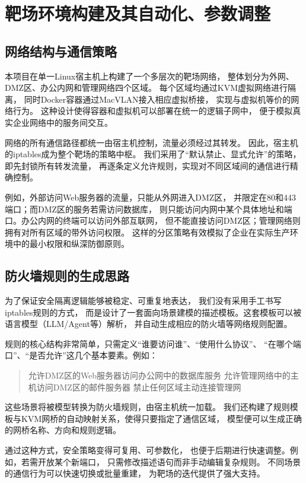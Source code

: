 \documentclass[lang=cn,10pt]{elegantbook}
\begin{document}
\section{靶场环境构建及其自动化、参数调整}

\subsection{网络结构与通信策略}

本项目在单一Linux宿主机上构建了一个多层次的靶场网络，
整体划分为外网、DMZ区、办公内网和管理网络四个区域。
每个区域均通过KVM虚拟网络进行隔离，
同时Docker容器通过MacVLAN接入相应虚拟桥接，
实现与虚拟机等价的网络行为。
这种设计使得容器和虚拟机可以部署在统一的逻辑子网中，
便于模拟真实企业网络中的服务间交互。

网络的所有通信路径都统一由宿主机控制，流量必须经过其转发。
因此，宿主机的iptables成为整个靶场的策略中枢。
我们采用了“默认禁止、显式允许”的策略，即先封锁所有转发流量，
再逐条定义允许规则，实现对不同区域间的通信进行精确控制。

例如，外部访问Web服务器的流量，只能从外网进入DMZ区，
并限定在80和443端口；而DMZ区的服务若需访问数据库，
则只能访问内网中某个具体地址和端口。办公内网的终端可以访问外部互联网，
但不能直接访问DMZ区；管理网络则拥有对所有区域的带外访问权限。
这样的分区策略有效模拟了企业在实际生产环境中的最小权限和纵深防御原则。

\subsection{防火墙规则的生成思路}

为了保证安全隔离逻辑能够被稳定、可重复地表达，
我们没有采用手工书写iptables规则的方式，
而是设计了一套面向场景建模的描述模板。这套模板可以被语言模型（LLM/Agent等）解析，
并自动生成相应的防火墙等网络规则配置。

规则的核心结构非常简单，只需定义“谁要访问谁”、“使用什么协议”、
“在哪个端口”、“是否允许”这几个基本要素。例如：

\begin{quote}
允许DMZ区的Web服务器访问办公网中的数据库服务  
允许管理网络中的主机访问DMZ区的邮件服务器  
禁止任何区域主动连接管理网
\end{quote}

这些场景将被模型转换为防火墙规则，由宿主机统一加载。
我们还构建了规则模板与KVM网桥的自动映射关系，使得只要指定了通信区域，
模型便可以生成正确的网桥名称、方向和规则逻辑。

通过这种方式，安全策略变得可复用、可参数化，
也便于后期进行快速调整。例如，若需开放某个新端口，
只需修改描述语句而非手动编辑复杂规则。
不同场景的通信行为可以快速切换或批量重建，
为靶场的迭代提供了强大支持。
\end{document}
